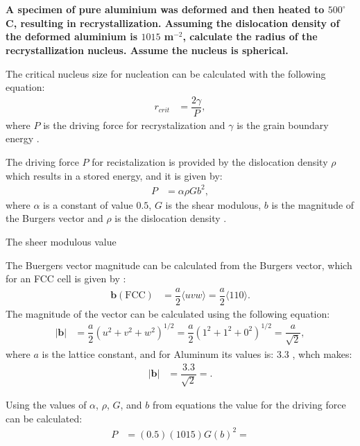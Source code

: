 \newpage
\section{}

\textbf{A specimen of pure aluminium was deformed and then heated to $500^{\circ}$C, resulting in recrystallization. Assuming the dislocation density of the deformed aluminium is $1015$ m$^{-2}$, calculate the radius of the recrystallization nucleus. Assume the nucleus is spherical.}

The critical nucleus size for nucleation can be calculated with the following equation:
\begin{align}
    \label{eq:r_recrystallization}
    r_{crit}&=\dfrac{2\gamma}{P},
\end{align}
where $P$ is the driving force for recrystalization and $\gamma$ is the grain boundary energy \citep{rollett2017recrystallization}.

The driving force $P$ for recistalization is provided by the dislocation density $\rho$ which results in a stored energy, and it is given by:
\begin{align}
    \label{eq:drivin_force}
    P&=\alpha \rho Gb^2,
\end{align}
where $\alpha$ is a constant of value $0.5$, $G$ is the shear modulous, $b$ is the magnitude of the Burgers vector and $\rho$ is the dislocation density \citep{rollett2017recrystallization}.

The sheer modulous value

The Buergers vector magnitude can be calculated from the Burgers vector, which for an FCC cell is given by \citep{callister2010materials}:
\begin{align}
    \label{eq:fcc_vector}
    \mathbf{b}(\text{FCC})&=\dfrac{a}{2}\langle uvw\rangle=\dfrac{a}{2}\langle110\rangle.
\end{align}
The magnitude of the vector can be calculated using the following equation:
\begin{align}
    \label{eq:vector_magnitude}
    \left|\mathbf{b}\right|&=\dfrac{a}{2}\left(u^{2}+v^{2}+w^{2}\right)^{1/2}=\dfrac{a}{2}\left(1^{2}+1^{2}+0^{2}\right)^{1/2}=\dfrac{a}{\sqrt{2}},
\end{align}
where $a$ is the lattice constant, and for Aluminum its values is: $3.3$ \citep{callister2010materials}, whch makes:
\begin{align}
    \label{eq:vector_magnitude01}
    \left|\mathbf{b}\right|&=\dfrac{3.3}{\sqrt{2}}=.
\end{align}

Using the values of $\alpha$, $\rho$, $G$, and $b$ from equations the value for the driving force can be calculated:
\begin{align}
    \label{eq:drivin_force}
    P&=\left(0.5\right)\left(1015\right)G\left(b\right)^2=
\end{align}



